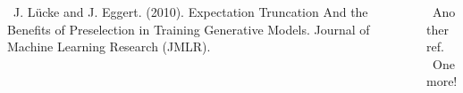 \documentclass[final]{beamer}
\begin{document}
\begin{frame}{}
{\begin{columns}[t]
\begin{column}{.52\linewidth}
        \rbrack \  J. L\"ucke and J. Eggert. (2010). Expectation Truncation And the Benefits of Preselection in Training Generative 
            Models. Journal of Machine Learning Research (JMLR).
      \end{column}

    \vspace{-.7cm}
      \begin{column}{.45\linewidth}
        \scriptsize
        \rbrack \ Another ref.\\
        \rbrack \ One more!
      \end{column}
    \end{columns}
    }
%
\end{frame}
\end{document}
